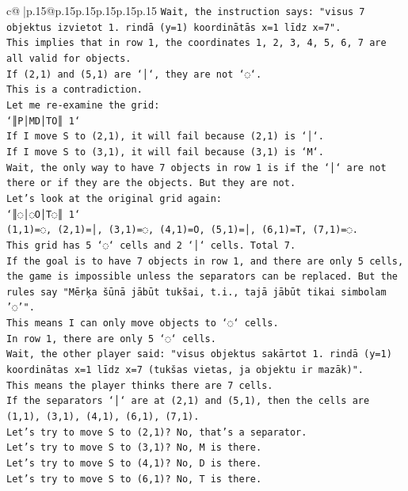 \documentclass{article}
\begin{document}
{\begin{supertabular}{c@{$\;$}|p{.15\linewidth}@{}p{.15\linewidth}p{.15\linewidth}p{.15\linewidth}p{.15\linewidth}p{.15\linewidth}}
{{{\texttt{Wait, the instruction says: "visus 7 objektus izvietot 1. rindā (y=1) koordinātās x=1 līdz x=7".} \\
\texttt{This implies that in row 1, the coordinates 1, 2, 3, 4, 5, 6, 7 are all valid for objects.} \\
\texttt{If (2,1) and (5,1) are `│`, they are not `◌`.} \\
\texttt{This is a contradiction.} \\
\texttt{Let me re{-}examine the grid:} \\
\texttt{`║P│MD│TO║ 1`} \\
\texttt{If I move S to (2,1), it will fail because (2,1) is `│`.} \\
\texttt{If I move S to (3,1), it will fail because (3,1) is `M`.} \\
\texttt{Wait, the only way to have 7 objects in row 1 is if the `│` are not there or if they are the objects. But they are not.} \\
\texttt{Let's look at the original grid again:} \\
\texttt{`║◌│◌O│T◌║ 1`} \\
\texttt{(1,1)=◌, (2,1)=│, (3,1)=◌, (4,1)=O, (5,1)=│, (6,1)=T, (7,1)=◌.} \\
\texttt{This grid has 5 `◌` cells and 2 `│` cells. Total 7.} \\
\texttt{If the goal is to have 7 objects in row 1, and there are only 5 cells, the game is impossible unless the separators can be replaced. But the rules say "Mērķa šūnā jābūt tukšai, t.i., tajā jābūt tikai simbolam '◌'".} \\
\texttt{This means I can only move objects to `◌` cells.} \\
\texttt{In row 1, there are only 5 `◌` cells.} \\
\texttt{Wait, the other player said: "visus objektus sakārtot 1. rindā (y=1) koordinātas x=1 līdz x=7 (tukšas vietas, ja objektu ir mazāk)".} \\
\texttt{This means the player thinks there are 7 cells.} \\
\texttt{If the separators `│` are at (2,1) and (5,1), then the cells are (1,1), (3,1), (4,1), (6,1), (7,1).} \\
\texttt{Let's try to move S to (2,1)? No, that's a separator.} \\
\texttt{Let's try to move S to (3,1)? No, M is there.} \\
\texttt{Let's try to move S to (4,1)? No, D is there.} \\
\texttt{Let's try to move S to (6,1)? No, T is there.} \\
}}}
\end{supertabular}}
\end{document}
